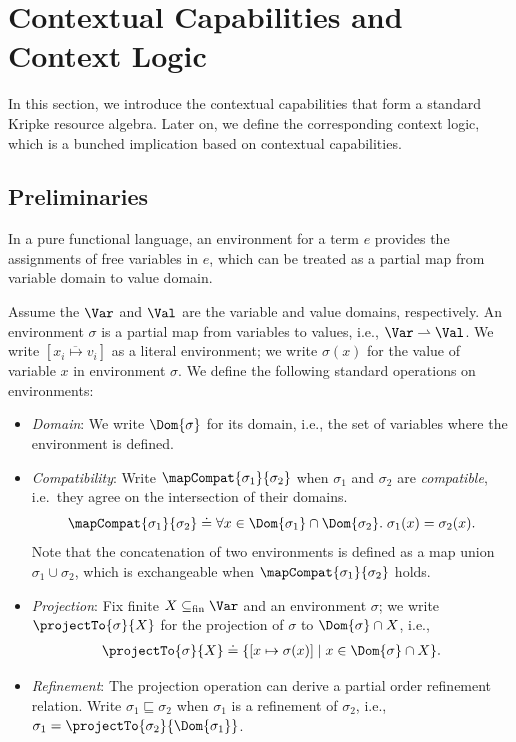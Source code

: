 \section{Contextual Capabilities and Context Logic}\label{sec:capabilities}

In this section, we introduce the contextual capabilities that form a standard Kripke resource algebra. Later on, we define the corresponding context logic, which is a bunched implication based on contextual capabilities.

\subsection{Preliminaries}

In a pure functional language, an environment for a term $e$ provides the assignments of free variables in $e$, which can be treated as a partial map from variable domain to value domain.

\begin{definition}[Environment]\label{def:environment} Assume the $\Var$ and $\Val$ are the variable and value domains, respectively. An environment $\sigma$ is a partial map from variables to values, i.e., $\Var \rightharpoonup \Val$. We write $[\overline{x_i \mapsto v_i}]$ as a literal environment; we write $\sigma(x)$ for the value of variable $x$ in environment $\sigma$.
We define the following standard operations on environments:
\begin{itemize}
  \item \emph{Domain}: We write $\Dom{\sigma}$ for its domain, i.e., the set of variables where the environment is defined.
  \item \emph{Compatibility}: Write $\mapCompat{\sigma_1}{\sigma_2}$ when $\sigma_1$ and $\sigma_2$ are
    \emph{compatible}, i.e.\ they agree on the intersection of their domains.
    \[
      \mapCompat{\sigma_1}{\sigma_2}
      \doteq
      \forall x \in \Dom{\sigma_1} \cap \Dom{\sigma_2}.\; \sigma_1(x) = \sigma_2(x).
    \]
  Note that the concatenation of two environments is defined as a map union $\sigma_1 \cup \sigma_2$, which is exchangeable when $\mapCompat{\sigma_1}{\sigma_2}$ holds.
  \item \emph{Projection}: Fix finite $X \subseteq_{\mathrm{fin}} \Var$ and an environment $\sigma$; we write $\projectTo{\sigma}{X}$ for the projection of $\sigma$ to $\Dom{\sigma} \cap X$, i.e.,
  \begin{align*}
    \projectTo{\sigma}{X} \doteq \{ [x\mapsto \sigma(x)] \mid x \in \Dom{\sigma} \cap X \}.
  \end{align*}
  \item \emph{Refinement}: The projection operation can derive a partial order refinement relation. Write $\sigma_1 \sqsubseteq \sigma_2$ when $\sigma_1$ is a refinement of $\sigma_2$, i.e., $\sigma_1 = \projectTo{\sigma_2}{\Dom{\sigma_1}} $.
\end{itemize}
\end{definition}

